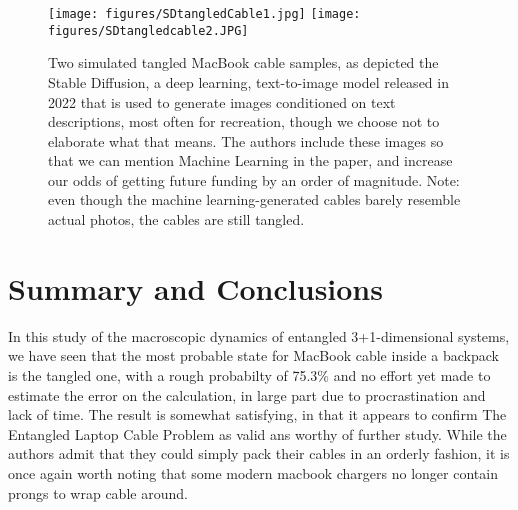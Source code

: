 \documentclass{JINST}
\begin{document}
\begin{figure}[htb]
    \centering
    \texttt{[image: figures/SDtangledCable1.jpg]} 
    \texttt{[image: figures/SDtangledcable2.JPG]} 
    \caption{Two simulated tangled MacBook cable samples, as depicted the Stable Diffusion, a deep learning, text-to-image model released in 2022 that is used to generate images conditioned on text descriptions, most often for recreation, though we choose not to elaborate what that means. The authors include these images so that we can mention Machine Learning in the paper, and increase our odds of getting future funding by an order of magnitude. Note: even though the machine learning-generated cables barely resemble actual photos, the cables are still tangled.}
    \label{fig:RealCables}
\end{figure}







\section{Summary and Conclusions} \label{sec:discussion}
In this study of the macroscopic dynamics of entangled
3+1-dimensional systems, we have seen that the most probable state for MacBook cable inside a backpack is the tangled one, with a rough probabilty of 75.3\% and no effort yet made to estimate the error on the calculation, in large part due to procrastination and lack of time. The result is somewhat satisfying, in that it appears to confirm The Entangled Laptop Cable Problem as valid ans worthy of further study. While the authors admit that they could simply pack their cables in an orderly fashion, it is once again worth noting that some modern macbook chargers no longer contain prongs to wrap cable around.
\end{document}
